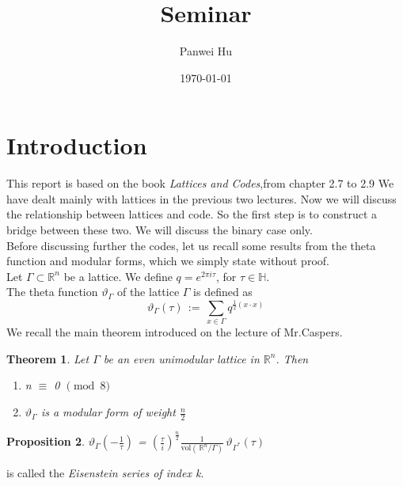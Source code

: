 \documentclass{article}
\title{Seminar}
\date{\today}
\author{Panwei Hu}
\newtheorem{theorem}{Theorem}[section]
\newtheorem{prop}[theorem]{Proposition}
\numberwithin{equation}{theorem}
\numberwithin{figure}{theorem}
\newcommand{\thetaFunction}[1]{\ensuremath{\vartheta_{#1}}}
\newcommand{\Real}{\ensuremath{\mathbb{R}}}
\newcommand{\imaginary}{\ensuremath{i}}
\newcommand{\HalfPlane}{\ensuremath{\mathbb{H}}}
\begin{document}
  \maketitle
  \newpage

\tableofcontents
	\newpage
  \newpage
\newpage
\section{Introduction}

This report is based on the book \emph{Lattices and Codes},from chapter 2.7 to 2.9
We have dealt mainly with lattices in the previous two lectures. Now we will discuss the relationship between lattices and code. So the first step is to construct a bridge between these two. We will discuss the binary case only.\\
Before discussing further the codes, let us recall some results from the theta function and modular forms, which we simply state without proof.\\
Let $\Gamma \subset \Real^n$ be a lattice. We define $q = e^{2\pi\imaginary\tau}$, for $\tau \in \HalfPlane$.\\
The theta function $\thetaFunction{\Gamma}$ of the lattice $\Gamma$ is defined as 
\[
	\thetaFunction{\Gamma}(\tau) \, := \,\sum_{x \in \Gamma} q^{\frac{1}{2}(x\cdot x)} 
\] 
We recall the main theorem introduced on the lecture of Mr.Caspers. 
\begin{theorem}\label{evenUniLattice}
Let $\Gamma$ be an even unimodular lattice in $\Real^n$. Then
\begin{enumerate}
	\item n $\equiv$ 0 $\pmod 8$
	\item {\thetaFunction{\Gamma}} is a modular form of weight $\frac{n}{2}$
\end{enumerate}
\end{theorem}

\begin{prop}\label{latticeAndDualThetaProp}
	$\thetaFunction{\Gamma}(-\frac{1}{\tau})$ = $(\frac{\tau}{i})^{\frac{n}{2}} \frac{1}{\mbox{vol}(\,\Real^n/\Gamma)}\,\thetaFunction{\Gamma^{*}}(\tau)$
\end{prop}
is called the \emph{Eisenstein series of index k}.
\end{document}
